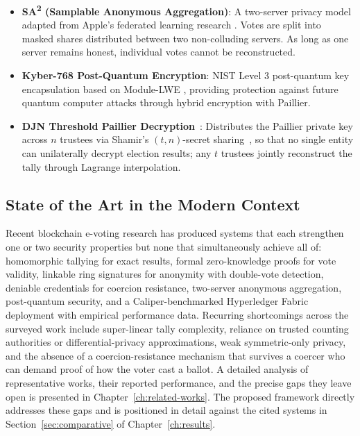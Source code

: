 \begin{itemize}
    \item \textbf{SA\textsuperscript{2} (Samplable Anonymous Aggregation)}: A two-server privacy model adapted from Apple's federated learning research \cite{sa2_apple}. Votes are split into masked shares distributed between two non-colluding servers. As long as one server remains honest, individual votes cannot be reconstructed.
    
    \item \textbf{Kyber-768 Post-Quantum Encryption}: NIST Level 3 post-quantum key encapsulation based on Module-LWE \cite{nist_kyber}, providing protection against future quantum computer attacks through hybrid encryption with Paillier.

    \item \textbf{DJN Threshold Paillier Decryption}~\cite{damgard2010}: Distributes the Paillier private key across $n$ trustees via Shamir's $(t,n)$-secret sharing~\cite{shamir1979}, so that no single entity can unilaterally decrypt election results; any $t$ trustees jointly reconstruct the tally through Lagrange interpolation.
\end{itemize}

\subsection{State of the Art in the Modern Context}
\label{subsec:state-of-art}

Recent blockchain e-voting research has produced systems that each strengthen one or two security properties but none that simultaneously achieve all of: homomorphic tallying for exact results, formal zero-knowledge proofs for vote validity, linkable ring signatures for anonymity with double-vote detection, deniable credentials for coercion resistance, two-server anonymous aggregation, post-quantum security, and a Caliper-benchmarked Hyperledger Fabric deployment with empirical performance data. Recurring shortcomings across the surveyed work include super-linear tally complexity, reliance on trusted counting authorities or differential-privacy approximations, weak symmetric-only privacy, and the absence of a coercion-resistance mechanism that survives a coercer who can demand proof of how the voter cast a ballot. A detailed analysis of representative works, their reported performance, and the precise gaps they leave open is presented in Chapter~\ref{ch:related-works}. The proposed framework directly addresses these gaps and is positioned in detail against the cited systems in Section~\ref{sec:comparative} of Chapter~\ref{ch:results}.

